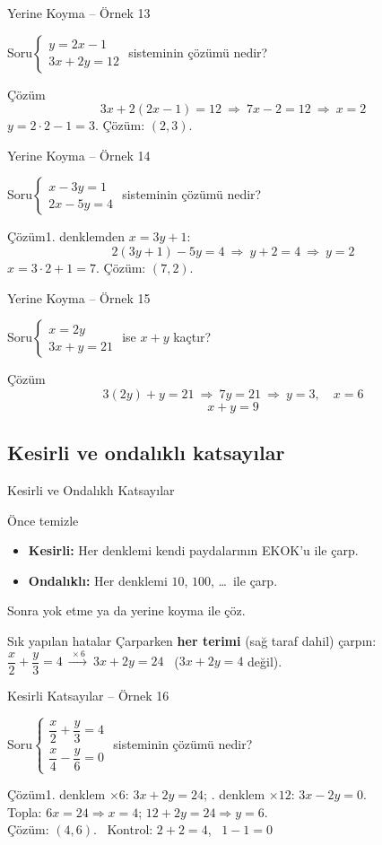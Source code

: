 \documentclass[aspectratio=169,11pt,handout]{beamer}
\newcommand{\soru}[3]{%
\begin{frame}{#1}
  \begin{block}{Soru}\large #2\end{block}
  \pause
  \begin{exampleblock}{Çözüm}\large #3\end{exampleblock}
\end{frame}}
\begin{document}
\soru{Yerine Koyma -- Örnek 13}
{\(\begin{cases}y=2x-1\\ 3x+2y=12\end{cases}\) \quad sisteminin çözümü nedir?}
{\[3x+2(2x-1)=12\ \Rightarrow\ 7x-2=12\ \Rightarrow\ x=2\]
\(y=2\cdot 2-1=3\). \quad Çözüm: \((2,3)\).}

\soru{Yerine Koyma -- Örnek 14}
{\(\begin{cases}x-3y=1\\ 2x-5y=4\end{cases}\) \quad sisteminin çözümü nedir?}
{1. denklemden \(x=3y+1\):
\[2(3y+1)-5y=4\ \Rightarrow\ y+2=4\ \Rightarrow\ y=2\]
\(x=3\cdot 2+1=7\). \quad Çözüm: \((7,2)\).}

\soru{Yerine Koyma -- Örnek 15}
{\(\begin{cases}x=2y\\ 3x+y=21\end{cases}\) \quad ise \(x+y\) kaçtır?}
{\[3(2y)+y=21\ \Rightarrow\ 7y=21\ \Rightarrow\ y=3,\quad x=6\]
\[x+y=9\]}

\subsection{Kesirli ve ondalıklı katsayılar}
\begin{frame}{Kesirli ve Ondalıklı Katsayılar}
\begin{block}{Önce temizle}
\begin{itemize}
\item \textbf{Kesirli:} Her denklemi kendi paydalarının EKOK'u ile çarp.
\item \textbf{Ondalıklı:} Her denklemi \(10\), \(100\), \dots\ ile çarp.
\end{itemize}
Sonra yok etme ya da yerine koyma ile çöz.
\end{block}
\begin{alertblock}{Sık yapılan hatalar}
Çarparken \textbf{her terimi} (sağ taraf dahil) çarpın: \(\dfrac{x}{2}+\dfrac{y}{3}=4\ \xrightarrow{\ \times 6\ }\ 3x+2y=24\) \ (\(3x+2y=4\) değil).
\end{alertblock}
\end{frame}

\soru{Kesirli Katsayılar -- Örnek 16}
{\(\begin{cases}\dfrac{x}{2}+\dfrac{y}{3}=4\\[8pt] \dfrac{x}{4}-\dfrac{y}{6}=0\end{cases}\) \quad sisteminin çözümü nedir?}
{1. denklem \(\times 6\): \(3x+2y=24\); \quad 2. denklem \(\times 12\): \(3x-2y=0\).\\[3pt]
Topla: \(6x=24\Rightarrow x=4\); \quad \(12+2y=24\Rightarrow y=6\).\\[3pt]
Çözüm: \((4,6)\). \ Kontrol: \(2+2=4\), \ \(1-1=0\) \checkmark}
\end{document}
